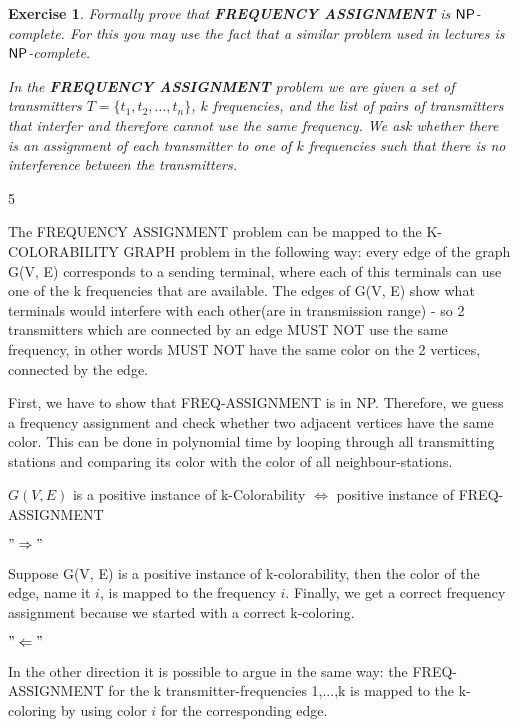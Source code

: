 \documentclass [11pt]{article}
\newtheorem{exercise}[theorem]{Exercise}
\newcommand{\ccfont}[1]{\protect\mathsf{#1}}
\newcommand{\NP}{\ccfont{NP}}
\newcommand{\solution}[1]{\noindent {\bf Solution.}  #1}
\begin{document}
\solution




\begin{exercise}
  \label{ex:frequency}
  Formally prove that \textbf{FREQUENCY ASSIGNMENT} is $\NP$-complete. For this you may use
  the fact that a similar problem used in lectures is $\NP$-complete.
      
    \smallskip
        
  \noindent In the \textbf{FREQUENCY ASSIGNMENT} problem we are given a set of transmitters $T=\{t_1, t_2, \ldots, t_n\}$,  $k$ frequencies, and the list of pairs of transmitters that interfer and therefore cannot use the same frequency. We ask whether there is an assignment of each transmitter to one of $k$ frequencies such that there is no interference between the transmitters. 
            
\end{exercise}

\solution{ 5}

The FREQUENCY ASSIGNMENT problem can be mapped to the K-COLORABILITY GRAPH problem in the following way: every edge of the graph G(V, E) corresponds to a sending terminal, where each of this terminals can use one of the k frequencies that are available. The edges of G(V, E) show what terminals would interfere with each other(are in transmission range) - so 2 transmitters which are connected by  an edge MUST NOT use the same frequency, in other words MUST NOT have the same color on the 2 vertices, connected by the edge.

First, we have to show that FREQ-ASSIGNMENT is in NP. Therefore, we guess a frequency assignment and check whether two adjacent vertices have the same color. This can be done in polynomial time by looping through all transmitting stations and comparing its color with the color of all neighbour-stations.

\medskip

 $G(V, E)$ is a positive instance of k-Colorability $\Leftrightarrow$ positive instance of FREQ-ASSIGNMENT

$ "\Rightarrow" $

Suppose G(V, E) is a positive instance of k-colorability, then the color of the edge, name it $i$, is mapped to the frequency $i$. Finally, we get a correct frequency assignment because we started with a correct k-coloring.

\medskip

$ "\Leftarrow" $

In the other direction it is possible to argue in the same way: the FREQ-ASSIGNMENT for the k transmitter-frequencies {1,...,k} is mapped to the k-coloring by using color $i$ for the corresponding edge.
\end{document}
